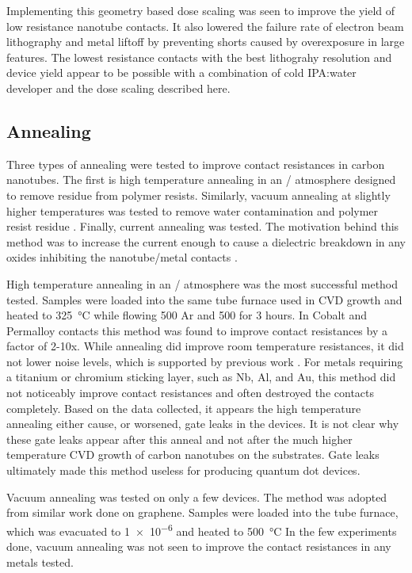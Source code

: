 Implementing this geometry based dose scaling was seen to improve the yield of low resistance nanotube contacts. It also lowered the failure rate of electron beam lithography and metal liftoff by preventing shorts caused by overexposure in large features. The lowest resistance contacts with the best lithograhy resolution and device yield appear to be possible with a combination of cold IPA:water developer and the dose scaling described here.

\subsection{Annealing}

Three types of annealing were tested to improve contact resistances in carbon nanotubes. The first is high temperature annealing in an / atmosphere \cite{Garcia2012, Lee2000, Kane2009, Kane2011, Stokes2010} designed to remove residue from polymer resists. Similarly, vacuum annealing at slightly higher temperatures was tested to remove water contamination and polymer resist residue \cite{Derycke2002, Kim2003, Pirkle2011, Chan2012, Cheng2011}. Finally, current annealing was tested. The motivation behind this method was to increase the current enough to cause a dielectric breakdown in any oxides inhibiting the nanotube/metal contacts \cite{Gramich2015, Wu2010}.

High temperature annealing in an / atmosphere was the most successful method tested. Samples were loaded into the same tube furnace used in CVD growth and heated to \SI{325}{\celsius} while flowing \SI{500}{\sccm} Ar and \SI{500}{\sccm}  for 3 hours. In Cobalt and Permalloy contacts this method was found to improve contact resistances by a factor of 2-10x. While annealing did improve room temperature resistances, it did not lower noise levels, which is supported by previous work \cite{Preusche2009}. For metals requiring a titanium or chromium sticking layer, such as Nb, Al, and Au, this method did not noticeably improve contact resistances and often destroyed the contacts completely. Based on the data collected, it appears the high temperature annealing either cause, or worsened, gate leaks in the devices. It is not clear why these gate leaks appear after this anneal and not after the much higher temperature CVD growth of carbon nanotubes on the substrates. Gate leaks ultimately made this method useless for producing quantum dot devices. 

Vacuum annealing was tested on only a few devices. The method was adopted from similar work done on graphene. Samples were loaded into the tube furnace, which was evacuated to \SI{1e-6}{\torr} and heated to \SI{500}{\celsius} In the few experiments done, vacuum annealing was not seen to improve the contact resistances in any metals tested. 

